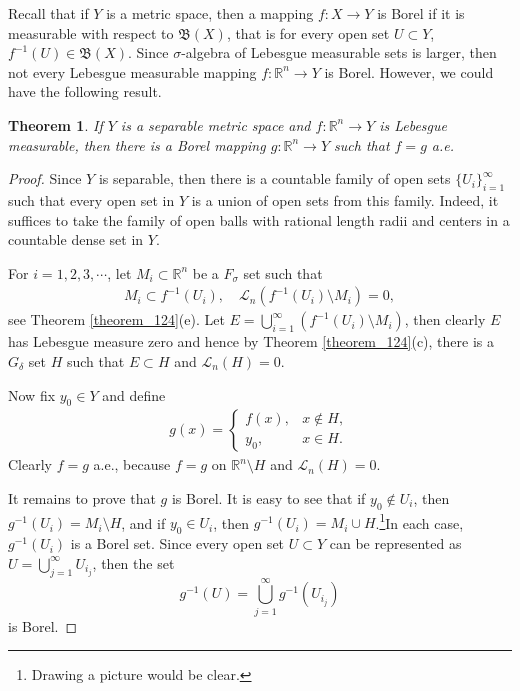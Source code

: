 \documentclass[11pt]{book}
\newtheorem{theorem}{Theorem}[chapter]
\theoremstyle{definition}
\numberwithin{equation}{chapter}
\begin{document}
\medskip

Recall that if $Y$ is a metric space, then a mapping $f: X \to Y$ is Borel if it is measurable with respect to $\mathfrak{B}(X)$, that is for every open set $U \subset Y$, $f^{-1}(U) \in \mathfrak{B}(X)$. Since $\sigma$-algebra of Lebesgue measurable sets is larger, then not every Lebesgue measurable mapping $f: \mathbb{R}^n \to Y$ is Borel. However, we could have the following result.

\medskip

\begin{theorem}\label{theorem_220}
If $Y$ is a separable metric space and $f: \mathbb{R}^n \to Y$ is Lebesgue measurable, then there is a Borel mapping $g: \mathbb{R}^n \to Y$ such that $f = g$ a.e.
\end{theorem}
\begin{proof}
Since $Y$ is separable, then there is a countable family of open sets $\{U_i\}^\infty_{i=1}$ such that every open set in $Y$ is a union of open sets from this family. Indeed, it suffices to take the family of open balls with rational length radii and centers in a countable dense set in $Y$.

For $i = 1,2,3,\cdots$, let $M_i \subset \mathbb{R}^n$ be a $F_\sigma$ set such that 
\begin{align*}
    M_i \subset f^{-1}(U_i), \quad \mathcal{L}_n\left(f^{-1}(U_i) \setminus M_i\right) = 0,
\end{align*}
see Theorem \ref{theorem_124}(e). Let $E = \bigcup^\infty_{i=1} \left(f^{-1}(U_i) \setminus M_i\right)$, then clearly $E$ has Lebesgue measure zero and hence by Theorem \ref{theorem_124}(c), there is a $G_\delta$ set $H$ such that $E \subset H$ and $\mathcal{L}_n(H) = 0$. 

Now fix $y_0 \in Y$ and define 
\begin{align*}
    g(x) = \begin{cases}
        f(x), & x \notin H,\\
        y_0, & x \in H.
    \end{cases}
\end{align*}
Clearly $f = g$ a.e., because $f = g$ on $\mathbb{R}^n \setminus H$ and $\mathcal{L}_n(H) = 0$. 

It remains to prove that $g$ is Borel. It is easy to see that if $y_0 \notin U_i$, then $g^{-1}(U_i) = M_i \setminus H$, and if $y_0 \in U_i$, then $g^{-1}(U_i) = M_i \cup H$.\footnote{Drawing a picture would be clear.}In each case, $g^{-1}(U_i)$ is a Borel set. Since every open set $U \subset Y$ can be represented as $U = \bigcup^\infty_{j=1} U_{i_j}$, then the set 
$$g^{-1}(U) = \bigcup^\infty_{j=1} g^{-1}(U_{i_j})$$ 
is Borel.
\end{proof}
\end{document}
